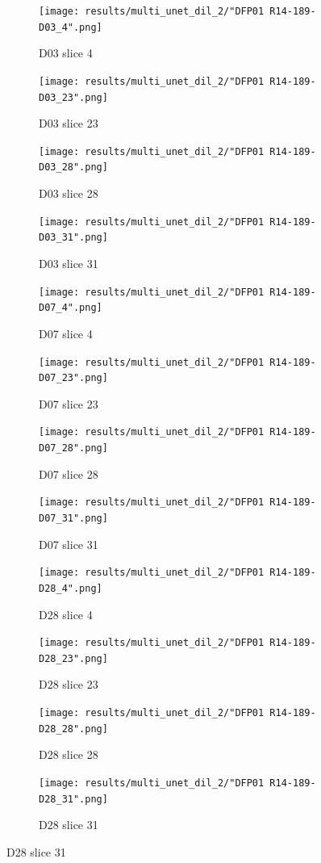 \begin{figure}[!htb]  
    \centering %
\begin{subfigure}{0.25\textwidth}
  \texttt{[image: results/multi\_unet\_dil\_2/"DFP01 R14-189-D03\_4".png]}
  \caption{D03 slice 4} 
\end{subfigure}\hfil %
\begin{subfigure}{0.25\textwidth}
  \texttt{[image: results/multi\_unet\_dil\_2/"DFP01 R14-189-D03\_23".png]}
  \caption{D03 slice 23}
\end{subfigure}\hfil %
\begin{subfigure}{0.25\textwidth}
  \texttt{[image: results/multi\_unet\_dil\_2/"DFP01 R14-189-D03\_28".png]}
  \caption{D03 slice 28}
\end{subfigure}\hfil %
\begin{subfigure}{0.25\textwidth}
  \texttt{[image: results/multi\_unet\_dil\_2/"DFP01 R14-189-D03\_31".png]}
  \caption{D03 slice 31}
\end{subfigure}


\medskip
\begin{subfigure}{0.25\textwidth}
  \texttt{[image: results/multi\_unet\_dil\_2/"DFP01 R14-189-D07\_4".png]}
  \caption{D07 slice 4}
\end{subfigure}\hfil %
\begin{subfigure}{0.25\textwidth}
  \texttt{[image: results/multi\_unet\_dil\_2/"DFP01 R14-189-D07\_23".png]}
  \caption{D07 slice 23}
\end{subfigure}\hfil %
\begin{subfigure}{0.25\textwidth}
  \texttt{[image: results/multi\_unet\_dil\_2/"DFP01 R14-189-D07\_28".png]}
  \caption{D07 slice 28}
\end{subfigure}\hfil %
\begin{subfigure}{0.25\textwidth}
  \texttt{[image: results/multi\_unet\_dil\_2/"DFP01 R14-189-D07\_31".png]}
  \caption{D07 slice 31}
\end{subfigure}


\medskip
\begin{subfigure}{0.25\textwidth}
  \texttt{[image: results/multi\_unet\_dil\_2/"DFP01 R14-189-D28\_4".png]}
  \caption{D28 slice 4}
\end{subfigure}\hfil %
\begin{subfigure}{0.25\textwidth}
  \texttt{[image: results/multi\_unet\_dil\_2/"DFP01 R14-189-D28\_23".png]}
  \caption{D28 slice 23}
\end{subfigure}\hfil %
\begin{subfigure}{0.25\textwidth}
  \texttt{[image: results/multi\_unet\_dil\_2/"DFP01 R14-189-D28\_28".png]}
  \caption{D28 slice 28}
\end{subfigure}\hfil %
\begin{subfigure}{0.25\textwidth}
  \texttt{[image: results/multi\_unet\_dil\_2/"DFP01 R14-189-D28\_31".png]}
  \caption{D28 slice 31}
\end{subfigure}
  

\end{figure}
